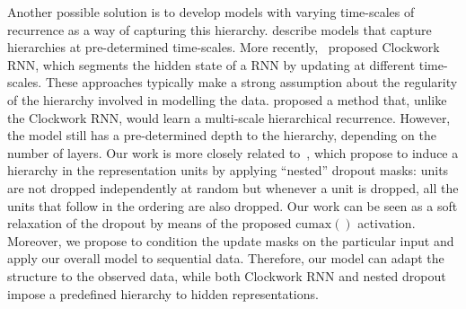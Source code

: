 \documentclass{article} \usepackage{iclr2019_conference,times}
\newcommand{\cumax}{\mathrm{cumax}}
\begin{document}
Another possible solution is to develop models with varying time-scales of recurrence as a way of capturing this hierarchy. \cite{el1996hierarchical, schmidhuber1991neural, lin1998learning} describe models that capture hierarchies at pre-determined time-scales.
More recently,~\cite{koutnik2014clockwork} proposed Clockwork RNN, which segments the hidden state of a RNN by updating at different time-scales.
These approaches typically make a strong assumption about the regularity of the hierarchy involved in modelling the data.
\cite{chung2016hierarchical} proposed a method that, unlike the Clockwork RNN, would learn a multi-scale hierarchical recurrence.
However, the model still has a pre-determined depth to the hierarchy, depending on the number of layers.
Our work is more closely related to~\cite{rippel2014learning}, which propose to induce a hierarchy in the representation units by applying ``nested'' dropout masks: units are not dropped independently at random but whenever a unit is dropped, all the units that follow in the ordering are also dropped. 
Our work can be seen as a soft relaxation of the dropout by means of the proposed $\cumax()$ activation.
Moreover, we propose to condition the update masks on the particular input and apply our overall model to sequential data. Therefore, our model can adapt the structure to the observed data, while both Clockwork RNN and nested dropout impose a predefined hierarchy to hidden representations.


















 
\end{document}
